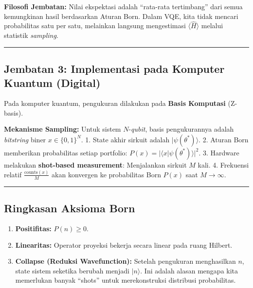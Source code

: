 \textbf{Filosofi Jembatan:} Nilai ekspektasi adalah ``rata-rata tertimbang'' dari semua kemungkinan hasil berdasarkan Aturan Born. Dalam VQE, kita tidak mencari probabilitas satu per satu, melainkan langsung mengestimasi \(\langle \hat{H} \rangle\) melalui statistik \emph{sampling}.

\begin{center}\rule{0.5\linewidth}{0.5pt}\end{center}

\hypertarget{jembatan-3-implementasi-pada-komputer-kuantum-digital}{%
\subsection{Jembatan 3: Implementasi pada Komputer Kuantum (Digital)}\label{jembatan-3-implementasi-pada-komputer-kuantum-digital}}

Pada komputer kuantum, pengukuran dilakukan pada \textbf{Basis Komputasi} (Z-basis).

\textbf{Mekanisme Sampling:} Untuk sistem \(N\)-\emph{qubit}, basis pengukurannya adalah \emph{bitstring} biner \(x \in \{0, 1\}^N\). 1. State akhir sirkuit adalah \(|\psi(\theta^*)\rangle\). 2. Aturan Born memberikan probabilitas setiap portfolio: \(P(x) = |\langle x | \psi(\theta^*) \rangle|^2\). 3. Hardware melakukan \textbf{shot-based measurement}: Menjalankan sirkuit \(M\) kali. 4. Frekuensi relatif \(\frac{\text{counts}(x)}{M}\) akan konvergen ke probabilitas Born \(P(x)\) saat \(M \to \infty\).

\begin{center}\rule{0.5\linewidth}{0.5pt}\end{center}

\hypertarget{ringkasan-aksioma-born}{%
\subsection{Ringkasan Aksioma Born}\label{ringkasan-aksioma-born}}

\begin{enumerate}
\def\labelenumi{\arabic{enumi}.}
\tightlist
\item
  \textbf{Positifitas:} \(P(n) \ge 0\).
\item
  \textbf{Linearitas:} Operator proyeksi bekerja secara linear pada ruang Hilbert.
\item
  \textbf{Collapse (Reduksi Wavefunction):} Setelah pengukuran menghasilkan \(n\), state sistem seketika berubah menjadi \(|n\rangle\). Ini adalah alasan mengapa kita memerlukan banyak ``shots'' untuk merekonstruksi distribusi probabilitas.
\end{enumerate}
